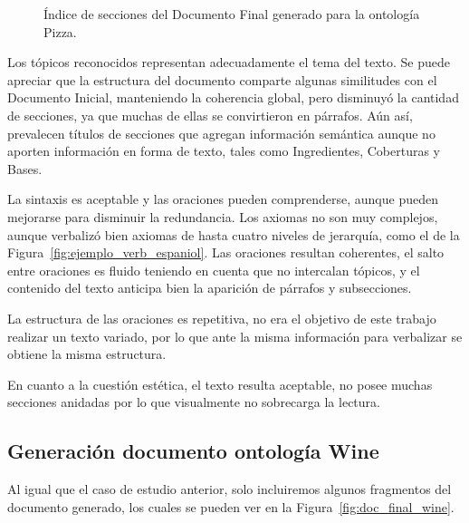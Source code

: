\begin{figure}
\begin{multicols}{2}
\small{
\begin{figure}[H]
\end{figure}

\begin{figure}[H]
\end{figure}
}
\end{multicols}
\caption{Índice de secciones del Documento Final generado para la ontología Pizza.}
\label{fig:indice_secciones_pizza}
\end{figure}

Los tópicos reconocidos representan adecuadamente el tema del texto. Se puede apreciar que la estructura del documento comparte algunas similitudes con el Documento Inicial, manteniendo la coherencia global, pero disminuyó la cantidad de secciones, ya que muchas de ellas se convirtieron en párrafos. Aún así, prevalecen títulos de secciones que agregan información semántica aunque no aporten información en forma de texto, tales como Ingredientes, Coberturas y Bases.

La sintaxis es aceptable y las oraciones pueden comprenderse, aunque pueden mejorarse para disminuir la redundancia. Los axiomas no son muy complejos, aunque verbalizó bien axiomas de hasta cuatro niveles de jerarquía, como el de la Figura~\ref{fig:ejemplo_verb_espaniol}. Las oraciones resultan coherentes, el salto entre oraciones es fluido teniendo en cuenta que no intercalan tópicos, y el contenido del texto anticipa bien la aparición de párrafos y subsecciones.

La estructura de las oraciones es repetitiva, no era el objetivo de este trabajo realizar un texto variado, por lo que ante la misma información para verbalizar se obtiene la misma estructura.

En cuanto a la cuestión estética, el texto resulta aceptable, no posee muchas secciones anidadas por lo que visualmente no sobrecarga la lectura.

\subsection{Generación documento ontología Wine}
Al igual que el caso de estudio anterior, solo incluiremos algunos fragmentos del documento generado, los cuales se pueden ver en la Figura~\ref{fig:doc_final_wine}.


